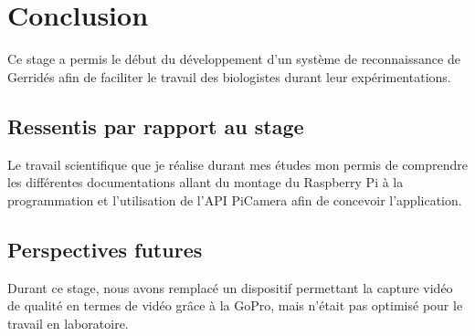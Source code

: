 \chapter{Conclusion}
    Ce stage a permis le début du développement d'un système de reconnaissance de Gerridés afin de faciliter le travail des biologistes durant leur expérimentations.
    

    \section{Ressentis par rapport au stage}
    Le travail scientifique que je réalise durant mes études mon permis de comprendre les différentes documentations allant du montage du Raspberry Pi à la programmation et l'utilisation de l'API PiCamera afin de concevoir l'application. 







    \section{Perspectives futures}
    Durant ce stage, nous avons remplacé un dispositif permettant la capture vidéo de qualité en termes de vidéo grâce à la GoPro, mais n'était pas optimisé pour le travail en laboratoire.

